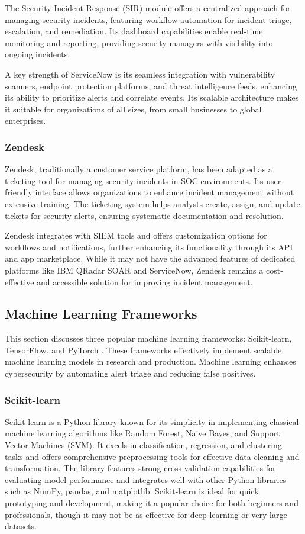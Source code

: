 The Security Incident Response (SIR) module offers a centralized approach for managing security incidents, featuring workflow automation for incident triage, escalation, and remediation. 
Its dashboard capabilities enable real-time monitoring and reporting, providing security managers with visibility into ongoing incidents.

A key strength of ServiceNow is its seamless integration with vulnerability scanners, endpoint protection platforms, and threat intelligence feeds, enhancing its ability to prioritize alerts and correlate events. 
Its scalable architecture makes it suitable for organizations of all sizes, from small businesses to global enterprises.

\subsubsection{Zendesk}
Zendesk, traditionally a customer service platform, has been adapted as a ticketing tool for managing security incidents in SOC environments. 
Its user-friendly interface allows organizations to enhance incident management without extensive training. 
The ticketing system helps analysts create, assign, and update tickets for security alerts, ensuring systematic documentation and resolution. 

Zendesk integrates with SIEM tools and offers customization options for workflows and notifications, further enhancing its functionality through its API and app marketplace. 
While it may not have the advanced features of dedicated platforms like IBM QRadar SOAR and ServiceNow, Zendesk remains a cost-effective and accessible solution for improving incident management.

\subsection{Machine Learning Frameworks}

This section discusses three popular machine learning frameworks: Scikit-learn, TensorFlow, and PyTorch \parencite{mlframeworks}.
These frameworks effectively implement scalable machine learning models in research and production. 
Machine learning enhances cybersecurity by automating alert triage and reducing false positives.

\subsubsection{Scikit-learn}
Scikit-learn is a Python library known for its simplicity in implementing classical machine learning algorithms like Random Forest, Naive Bayes, and Support Vector Machines (SVM). 
It excels in classification, regression, and clustering tasks and offers comprehensive preprocessing tools for effective data cleaning and transformation. 
The library features strong cross-validation capabilities for evaluating model performance and integrates well with other Python libraries such as NumPy, pandas, and matplotlib. Scikit-learn is ideal for quick prototyping and development, making it a popular choice for both beginners and professionals, though it may not be as effective for deep learning or very large datasets.

